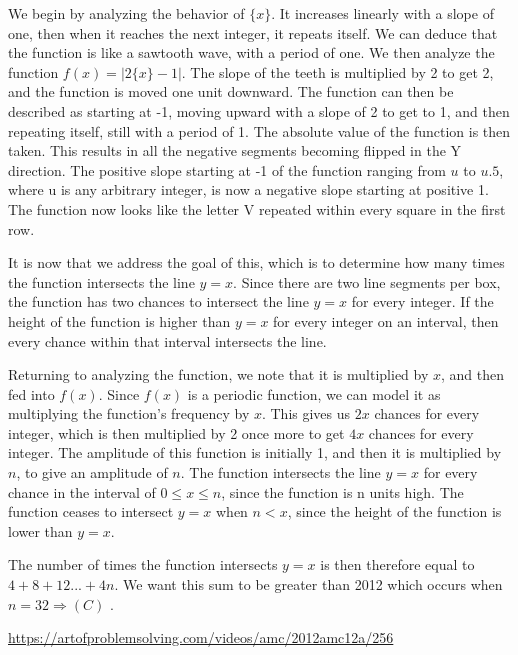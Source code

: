 \begin{enumerate}
 We begin by analyzing the behavior of $\{x\}$. It increases linearly with a slope of one, then when it reaches the next integer, it repeats itself. We can deduce that the function is like a sawtooth wave, with a period of one. We then analyze the function $f(x)=|2\{x\}-1|$. The slope of the teeth is multiplied by 2 to get 2, and the function is moved one unit downward. The function can then be described as starting at -1, moving upward with a slope of 2 to get to 1, and then repeating itself, still with a period of 1. The absolute value of the function is then taken. This results in all the negative segments becoming flipped in the Y direction. The positive slope starting at -1 of the function ranging from $u$ to $u.5$, where u is any arbitrary integer, is now a negative slope starting at positive 1.   The function now looks like the letter V repeated within every square in the first row. 

 It is now that we address the goal of this, which is to determine how many times the function intersects the line $y=x$. Since there are two line segments per box, the function has two chances to intersect the line $y=x$ for every integer. If the height of the function is higher than $y=x$ for every integer on an interval, then every chance within that interval intersects the line.  

 Returning to analyzing the function, we note that it is multiplied by $x$, and then fed into $f(x)$. Since $f(x)$ is a periodic function, we can model it as multiplying the function's frequency by $x$. This gives us $2x$ chances for every integer, which is then multiplied by 2 once more to get $4x$ chances for every integer. The amplitude of this function is initially 1, and then it is multiplied by $n$, to give an amplitude of $n$. The function intersects the line $y=x$ for every chance in the interval of $0\leq x \leq n$, since the function is n units high. The function ceases to intersect $y=x$ when $n < x$, since the height of the function is lower than $y=x$. 

 The number of times the function intersects $y=x$ is then therefore equal to $4+8+12...+4n$. We want this sum to be greater than 2012 which occurs when $n=32 \Rightarrow \boxed{(C)}$ .

 \href{https://artofproblemsolving.com/videos/amc/2012amc12a/256}{https://artofproblemsolving.com/videos/amc/2012amc12a/256}

 


\end{enumerate}